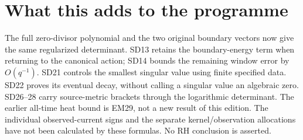 \section*{What this adds to the programme}
The full zero-divisor polynomial and the two original boundary vectors now
give the same regularized determinant. SD13 retains the boundary-energy
term when returning to the canonical action; SD14 bounds the remaining
window error by $O(q^{-1})$. SD21 controls the smallest singular value
using finite specified data. SD22 proves its eventual decay, without
calling a singular value an algebraic zero. SD26--28 carry source-metric
brackets through the logarithmic determinant. The earlier all-time heat
bound is EM29, not a new result of this edition.
The individual observed-current signs and the separate kernel/observation
allocations have not been calculated by these formulas. No RH conclusion
is asserted.
\endgroup
